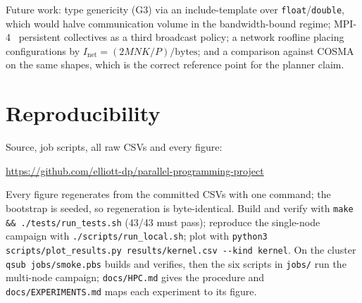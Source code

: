 \documentclass[conference,10pt]{IEEEtran}
\begin{document}
Future work: type genericity (G3) via an include-template over
\texttt{float}/\texttt{double}, which would halve communication volume in the
bandwidth-bound regime; MPI-4~\cite{mpi40} persistent collectives as a third
broadcast policy; a network roofline placing configurations by
$I_{\text{net}} = (2MNK/P)/\text{bytes}$; and a comparison against COSMA on the
same shapes, which is the correct reference point for the planner claim.

\section*{Reproducibility}

Source, job scripts, all raw CSVs and every figure:
\begin{center}
\url{https://github.com/elliott-dp/parallel-programming-project}
\end{center}
Every figure regenerates from the committed CSVs with one command; the
bootstrap is seeded, so regeneration is byte-identical. Build and verify with
\texttt{make \&\& ./tests/run\_tests.sh} (43/43 must pass); reproduce the
single-node campaign with \texttt{./scripts/run\_local.sh}; plot with
\texttt{python3 scripts/plot\_results.py results/kernel.csv -{}-kind kernel}.
On the cluster \texttt{qsub jobs/smoke.pbs} builds and verifies, then the six
scripts in \texttt{jobs/} run the multi-node campaign; \texttt{docs/HPC.md}
gives the procedure and \texttt{docs/EXPERIMENTS.md} maps each experiment to
its figure.
\end{document}
